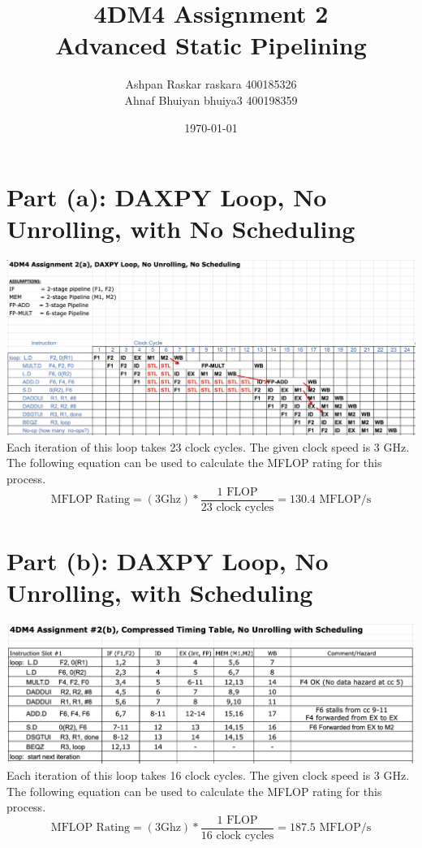 \documentclass[12pt, letterpaper, titlepage, hidelinks]{article}
\title{4DM4 Assignment 2 \\ Advanced Static Pipelining}
\author{Ashpan Raskar raskara 400185326\\
		Ahnaf Bhuiyan bhuiya3 400198359}
\date{\today}
\begin{document}
\maketitle
\tableofcontents
\newpage
\setlength{\parindent}{0pt}
\setcounter{secnumdepth}{0}
\section{Part (a): DAXPY Loop, No Unrolling, with No Scheduling}
	\includegraphics[width=\textwidth]{2a}
	Each iteration of this loop takes 23 clock cycles. The given clock speed is 3 GHz. The following equation can be used to calculate the MFLOP rating for this process.
	\begin{equation}
		\text{MFLOP Rating} = (3 \text{{Ghz}}) * \frac{1 \text{ FLOP}}{23 \text{ clock cycles}} = 130.4 \text{ MFLOP/s}
	\end{equation}
\section{Part (b): DAXPY Loop, No Unrolling, with Scheduling}
	\includegraphics[width=\textwidth]{2b}
	Each iteration of this loop takes 16 clock cycles. The given clock speed is 3 GHz. The following equation can be used to calculate the MFLOP rating for this process.
	\begin{equation}
		\text{MFLOP Rating} = (3 \text{{Ghz}}) * \frac{1 \text{ FLOP}}{16 \text{ clock cycles}} = 187.5 \text{ MFLOP/s}
	\end{equation}
\end{document}
